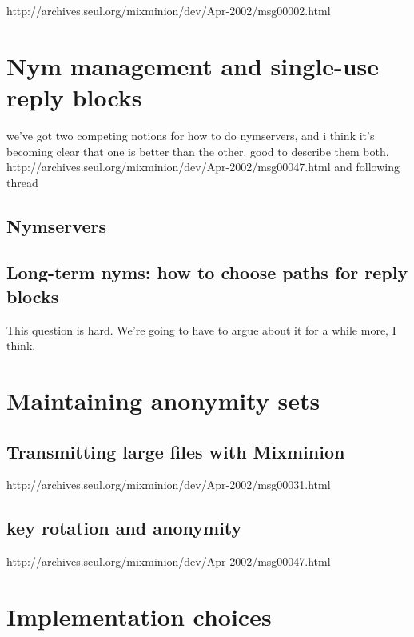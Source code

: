 \documentclass{llncs}
\begin{document}
http://archives.seul.org/mixminion/dev/Apr-2002/msg00002.html


\section{Nym management and single-use reply blocks}
\label{sec:nymservers}

we've got two competing notions for how to do nymservers, and i think
it's becoming clear that one is better than the other. good to describe
them both.
http://archives.seul.org/mixminion/dev/Apr-2002/msg00047.html
and following thread

\subsection{Nymservers}

\subsection{Long-term nyms: how to choose paths for reply blocks}

This question is hard. We're going to have to argue about it for a
while more, I think.


\section{Maintaining anonymity sets}

\subsection{Transmitting large files with Mixminion}

http://archives.seul.org/mixminion/dev/Apr-2002/msg00031.html

\subsection{key rotation and anonymity}

http://archives.seul.org/mixminion/dev/Apr-2002/msg00047.html


\section{Implementation choices}
\label{sec:implementation}
\end{document}

